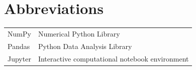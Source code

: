 \chapter*{Abbreviations}

\begin{tabular}{ll}
NumPy & Numerical Python Library \\[0.3cm]
Pandas & Python Data Analysis Library \\[0.3cm]
Jupyter & Interactive computational notebook environment \\[0.3cm]
\end{tabular}

\vspace{1cm}